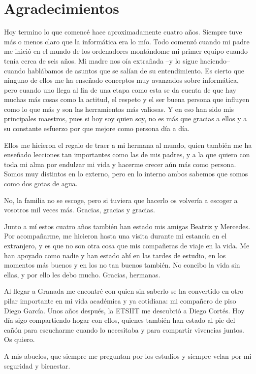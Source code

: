 \chapter*{Agradecimientos}

Hoy termino lo que comencé hace aproximadamente cuatro años. Siempre tuve más o menos claro que la informática era lo mío. Todo comenzó cuando mi padre me inició en el mundo de los ordenadores montándome mi primer equipo cuando tenía cerca de seis años. Mi madre nos oía extrañada --y lo sigue haciendo-- cuando hablábamos de asuntos que se salían de su entendimiento. Es cierto que ninguno de ellos me ha enseñado conceptos muy avanzados sobre informática, pero cuando uno llega al fin de una etapa como esta se da cuenta de que hay muchas más cosas como la actitud, el respeto y el ser buena persona que influyen como lo que más y son las herramientas más valiosas. Y en eso han sido mis principales maestros, pues si hoy soy quien soy, no es más que gracias a ellos y a su constante esfuerzo por que mejore como persona día a día. 

Ellos me hicieron el regalo de traer a mi hermana al mundo, quien también me ha enseñado lecciones tan importantes como las de mis padres, y a la que quiero con toda mi alma por endulzar mi vida y hacerme crecer aún más como persona. Somos muy distintos en lo externo, pero en lo interno ambos sabemos que somos como dos gotas de agua.

No, la familia no se escoge, pero si tuviera que hacerlo os volvería a escoger a vosotros mil veces más. Gracias, gracias y gracias.

Junto a mí estos cuatro años también han estado mis amigas Beatriz y Mercedes. Por acompañarme, me hicieron hasta una visita durante mi estancia en el extranjero, y es que no son otra cosa que mis compañeras de viaje en la vida. Me han apoyado como nadie y han estado ahí en las tardes de estudio, en los momentos más buenos y en los no tan buenos también. No concibo la vida sin ellas, y por ello les debo mucho. Gracias, hermanas.

Al llegar a Granada me encontré con quien sin saberlo se ha convertido en otro pilar importante en mi vida académica y ya cotidiana: mi compañero de piso Diego García. Unos años después, la ETSIIT me descubrió a Diego Cortés. Hoy día sigo compartiendo hogar con ellos, quienes también han estado al pie del cañón para escucharme cuando lo necesitaba y para compartir vivencias juntos. Os quiero.

A mis abuelos, que siempre me preguntan por los estudios y siempre velan por mi seguridad y bienestar.

